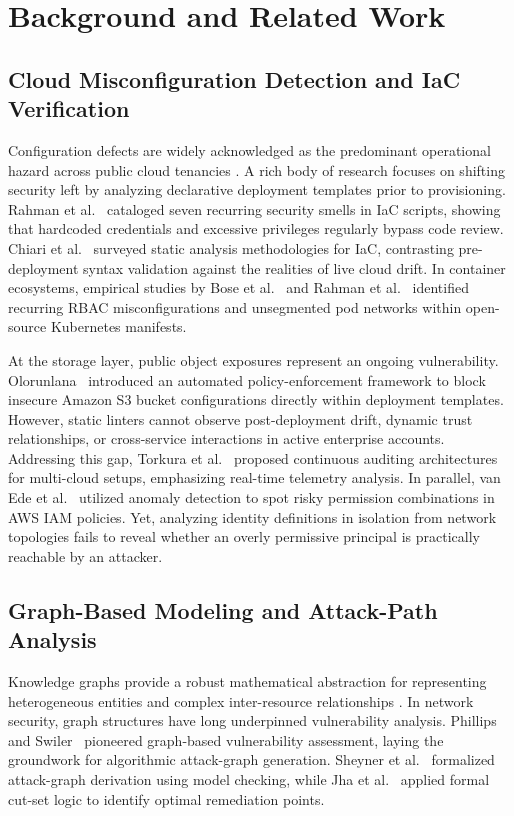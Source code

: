 \documentclass[conference]{IEEEtran}
\begin{document}
\section{Background and Related Work}

\subsection{Cloud Misconfiguration Detection and IaC Verification}
Configuration defects are widely acknowledged as the predominant operational hazard across public cloud tenancies \cite{liu2024misconfigurations}. A rich body of research focuses on shifting security left by analyzing declarative deployment templates prior to provisioning. Rahman et al.~\cite{rahman2019icsesmells} cataloged seven recurring security smells in IaC scripts, showing that hardcoded credentials and excessive privileges regularly bypass code review. Chiari et al.~\cite{chiari2022iacsurvey} surveyed static analysis methodologies for IaC, contrasting pre-deployment syntax validation against the realities of live cloud drift. In container ecosystems, empirical studies by Bose et al.~\cite{bose2021kubernetes} and Rahman et al.~\cite{rahman2023k8smisconfig} identified recurring RBAC misconfigurations and unsegmented pod networks within open-source Kubernetes manifests.

At the storage layer, public object exposures represent an ongoing vulnerability. Olorunlana~\cite{olorunlana2026s3} introduced an automated policy-enforcement framework to block insecure Amazon S3 bucket configurations directly within deployment templates. However, static linters cannot observe post-deployment drift, dynamic trust relationships, or cross-service interactions in active enterprise accounts. Addressing this gap, Torkura et al.~\cite{torkura2021multicloud} proposed continuous auditing architectures for multi-cloud setups, emphasizing real-time telemetry analysis. In parallel, van Ede et al.~\cite{vanede2022iam} utilized anomaly detection to spot risky permission combinations in AWS IAM policies. Yet, analyzing identity definitions in isolation from network topologies fails to reveal whether an overly permissive principal is practically reachable by an attacker.

\subsection{Graph-Based Modeling and Attack-Path Analysis}
Knowledge graphs provide a robust mathematical abstraction for representing heterogeneous entities and complex inter-resource relationships \cite{hogan2021knowledge}. In network security, graph structures have long underpinned vulnerability analysis. Phillips and Swiler~\cite{phillips1998graph} pioneered graph-based vulnerability assessment, laying the groundwork for algorithmic attack-graph generation. Sheyner et al.~\cite{sheyner2002automated} formalized attack-graph derivation using model checking, while Jha et al.~\cite{jha2002formal} applied formal cut-set logic to identify optimal remediation points.
\end{document}
